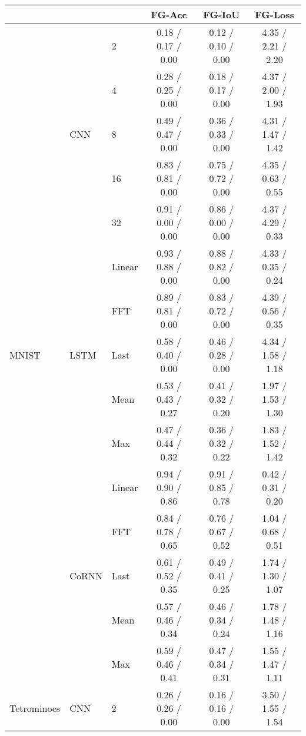 \begin{table*}[ht!]
\centering
\begin{minipage}{0.99\linewidth}
\centering
\begin{tabular}{lllccc}
\toprule
 &  &  & FG-Acc & FG-IoU & FG-Loss \\
\midrule
\multirow{15}{*}{MNIST} 
 & \multirow{5}{*}{CNN} 
 & 2 
 & 0.18 / 0.17 / 0.00 
 & 0.12 / 0.10 / 0.00 
 & 4.35 / 2.21 / 2.20 
\\
 &  & 4 
 & 0.28 / 0.25 / 0.00 
 & 0.18 / 0.17 / 0.00 
 & 4.37 / 2.00 / 1.93 
\\
 &  & 8 
 & 0.49 / 0.47 / 0.00 
 & 0.36 / 0.33 / 0.00 
 & 4.31 / 1.47 / 1.42 
\\
 &  & 16 
 & 0.83 / 0.81 / 0.00 
 & 0.75 / 0.72 / 0.00 
 & 4.35 / 0.63 / 0.55 
\\
 &  & 32 
 & 0.91 / 0.00 / 0.00 
 & 0.86 / 0.00 / 0.00 
 & 4.37 / 4.29 / 0.33 
\\
\cline{2-6}
 & \multirow{5}{*}{LSTM} 
 & Linear 
 & 0.93 / 0.88 / 0.00 
 & 0.88 / 0.82 / 0.00 
 & 4.33 / 0.35 / 0.24 
\\
 &  & FFT 
 & 0.89 / 0.81 / 0.00 
 & 0.83 / 0.72 / 0.00 
 & 4.39 / 0.56 / 0.35 
\\
 &  & Last 
 & 0.58 / 0.40 / 0.00 
 & 0.46 / 0.28 / 0.00 
 & 4.34 / 1.58 / 1.18 
\\
 &  & Mean 
 & 0.53 / 0.43 / 0.27 
 & 0.41 / 0.32 / 0.20 
 & 1.97 / 1.53 / 1.30 
\\
 &  & Max 
 & 0.47 / 0.44 / 0.32 
 & 0.36 / 0.32 / 0.22 
 & 1.83 / 1.52 / 1.42 
\\
\cline{2-6}
 & \multirow{5}{*}{CoRNN} 
 & Linear 
 & 0.94 / 0.90 / 0.86 
 & 0.91 / 0.85 / 0.78 
 & 0.42 / 0.31 / 0.20 
\\
 &  & FFT 
 & 0.84 / 0.78 / 0.65 
 & 0.76 / 0.67 / 0.52 
 & 1.04 / 0.68 / 0.51 
\\
 &  & Last 
 & 0.61 / 0.52 / 0.35 
 & 0.49 / 0.41 / 0.25 
 & 1.74 / 1.30 / 1.07 
\\
 &  & Mean 
 & 0.57 / 0.46 / 0.34 
 & 0.46 / 0.34 / 0.24 
 & 1.78 / 1.48 / 1.16 
\\
 &  & Max 
 & 0.59 / 0.46 / 0.41 
 & 0.47 / 0.34 / 0.31 
 & 1.55 / 1.47 / 1.11 
\\
\midrule
\multirow{15}{*}{Tetrominoes} 
 & \multirow{5}{*}{CNN} 
 & 2 
 & 0.26 / 0.26 / 0.00 
 & 0.16 / 0.16 / 0.00 
 & 3.50 / 1.55 / 1.54 
\\

\end{tabular}
\end{minipage}
\end{table*}
